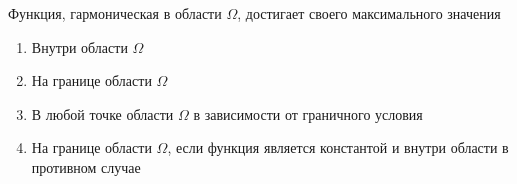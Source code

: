 Функция, гармоническая в области \(\Omega\), достигает своего максимального значения

\begin{enumerate}[label=\arabic*)]
    \item Внутри области \(\Omega\)
    \item На границе области \(\Omega\)
    \item В любой точке области \(\Omega\) в зависимости от граничного условия
    \item На границе области \(\Omega\), если функция является константой и внутри области в противном случае
\end{enumerate}

